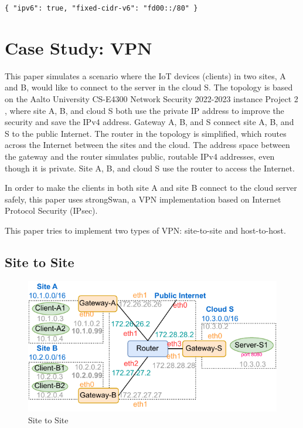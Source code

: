\documentclass[article]{aaltoseries}
\begin{document}
\texttt{\{
  "ipv6": true,
  "fixed-cidr-v6": "fd00::/80"
\}}



\section{Case Study: VPN}

This paper simulates a scenario where the IoT devices (clients) in two sites, A and B, would like to connect to the server in the cloud S. The topology is based on the Aalto University CS-E4300 Network Security 2022-2023 instance Project 2 \cite{aura_peltonen_bui_2022}, where site A, B, and cloud S both use the private IP address to improve the security and save the IPv4 address. Gateway A, B, and S connect site A, B, and S to the public Internet. The router in the topology is simplified, which routes across the Internet between the sites and the cloud. The address space between the gateway and the router simulates public, routable IPv4 addresses, even though it is private. Site A, B, and cloud S use the router to access the Internet.

In order to make the clients in both site A and site B connect to the cloud server safely, this paper uses strongSwan, a VPN implementation based on Internet Protocol Security (IPsec).

This paper tries to implement two types of VPN: site-to-site and host-to-host.

\subsection{Site to Site}
\begin{figure}[t!]
  \begin{center}
    \includegraphics[width=1.1\textwidth]{figures/site-to-site.pdf}
    \caption{Site to Site}
    \label{fig:site2site}
  \end{center}
\end{figure}
\end{document}
